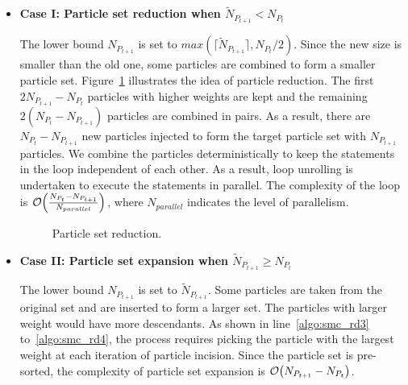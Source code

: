 \begin{itemize}
\item {\bf Case I: Particle set reduction when $\widetilde{N}_{P_{t+1}} < {N_{P_t}}$} 

The lower bound ${N_{P_{t+1}}}$ is set to $max\left(\lceil\widetilde{N}_{P_{t+1}}\rceil, {N_{P_t}}/2\right)$.
Since the new size is smaller than the old one, some particles are combined to form a smaller particle set.
Figure~\ref{fig:tuning} illustrates the idea of particle reduction.
The first $2{N_{P_{t+1}}}-{N_{P_t}}$ particles with higher weights are kept and the remaining $2({N_{P_t}}-{N_{P_{t+1}}})$ particles are combined in pairs.
As a result, there are ${N_{P_t}}-{N_{P_{t+1}}}$ new particles injected to form the target particle set with ${N_{P_{t+1}}}$ particles.
We combine the particles deterministically to keep the statements in the loop independent of each other.
As a result, loop unrolling is undertaken to execute the statements in parallel.
The complexity of the loop is $\mathop{}\mathopen{}\mathcal{O}\mathopen{}\left(\frac{{N_{P_t}}-{N_{P_{t+1}}}}{N_{parallel}}\right)$, where $N_{parallel}$ indicates the level of parallelism.

\setcounter{subfigure}{0}
\begin{figure}[t!]
\centering
{}
\caption{Particle set reduction.}
\label{fig:tuning}
\end{figure}

\item {\bf Case II: Particle set expansion when $\widetilde{N}_{P_{t+1}} \geq {N_{P_t}}$}

The lower bound ${N_{P_{t+1}}}$ is set to $\widetilde{N}_{P_{t+1}}$.
Some particles are taken from the original set and are inserted to form a larger set.
The particles with larger weight would have more descendants.
As shown in line~\ref{algo:smc_rd3} to~\ref{algo:smc_rd4}, the process requires picking the particle with the largest weight at each iteration of particle incision.
Since the particle set is pre-sorted, the complexity of particle set expansion is $\mathop{}\mathopen{}\mathcal{O}\mathopen{}\left(N_{P_{t+1}}-{N_{P_t}}\right)$.

\end{itemize}

